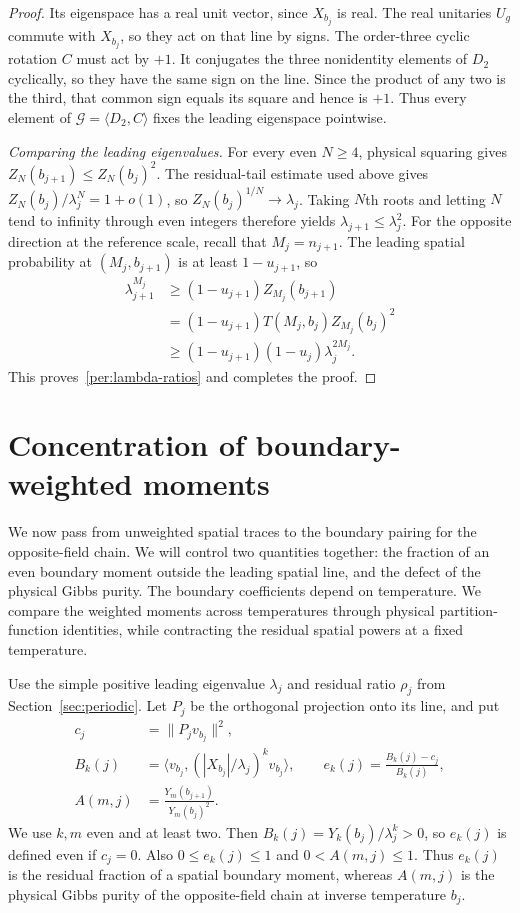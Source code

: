 \documentclass[11pt]{article}
\theoremstyle{remark}
\numberwithin{equation}{section}
\begin{document}
\begin{proof}
Its eigenspace has a real unit vector, since $X_{b_j}$ is real.
The real unitaries $U_g$ commute with $X_{b_j}$, so they act on that
line by signs.
The order-three cyclic rotation $C$ must act by $+1$.  It conjugates
the three nonidentity elements of $D_2$ cyclically, so they have the
same sign on the line.  Since the product of any two is the third,
that common sign equals its square and hence is $+1$.
Thus every element of $\mathcal G=\langle D_2,C\rangle$ fixes the
leading eigenspace pointwise.

\emph{Comparing the leading eigenvalues.}
For every even $N\ge4$, physical squaring gives
$Z_N(b_{j+1})\le Z_N(b_j)^2$. The residual-tail estimate used above
gives $Z_N(b_j)/\lambda_j^N=1+o(1)$, so
$Z_N(b_j)^{1/N}\to\lambda_j$. Taking $N$th roots and letting $N$
tend to infinity through even integers therefore yields
$\lambda_{j+1}\le\lambda_j^2$.
For the opposite direction at the reference scale, recall that
$M_j=n_{j+1}$.  The leading spatial probability at $(M_j,b_{j+1})$
is at least $1-u_{j+1}$, so
\[
 \begin{split}
 \lambda_{j+1}^{M_j}
 &\ge(1-u_{j+1})Z_{M_j}(b_{j+1})\\
 &= (1-u_{j+1})T(M_j,b_j)Z_{M_j}(b_j)^2\\
 &\ge(1-u_{j+1})(1-u_j)\lambda_j^{2M_j}.
 \end{split}
\]
This proves~\eqref{per:lambda-ratios} and completes the proof.
\end{proof}

\section{Concentration of boundary-weighted moments}\label{sec:boundary}
We now pass from unweighted spatial traces to the boundary pairing for
the opposite-field chain. We will control two quantities together: the
fraction of an even boundary moment outside the leading spatial line,
and the defect of the physical Gibbs purity. The boundary coefficients
depend on temperature. We compare the weighted moments across temperatures
through physical partition-function identities, while contracting the
residual spatial powers at a fixed temperature.

Use the simple positive leading eigenvalue $\lambda_j$ and residual
ratio $\rho_j$ from Section~\ref{sec:periodic}. Let $P_j$ be the
orthogonal projection onto its line, and put
\begin{equation}\label{be:definitions}
 \begin{split}
 c_j&=\lVert P_jv_{b_j}\rVert^2,\\
 B_k(j)&=\langle v_{b_j},(|X_{b_j}|/\lambda_j)^k v_{b_j}\rangle,
 \qquad e_k(j)=\frac{B_k(j)-c_j}{B_k(j)},\\
 A(m,j)&=\frac{Y_m(b_{j+1})}{Y_m(b_j)^2}.
 \end{split}
\end{equation}
We use $k,m$ even and at least two. Then
$B_k(j)=Y_k(b_j)/\lambda_j^k>0$, so $e_k(j)$ is defined even if
$c_j=0$. Also $0\le e_k(j)\le1$ and $0<A(m,j)\le1$.
Thus $e_k(j)$ is the residual fraction of a spatial boundary moment,
whereas $A(m,j)$ is the physical Gibbs purity of the opposite-field
chain at inverse temperature $b_j$.
\end{document}
